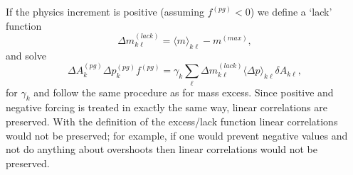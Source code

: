 If the physics increment is positive (assuming $f^{(pg)}<0$) we define a `lack' function
\begin{equation}
\Delta m^{(lack)}_{k\ell}=\langle m\rangle_{k\ell}-m^{(max)},
\end{equation}
and solve
\begin{equation}
\Delta A_k^{(pg)}\Delta p_k^{(pg)}f^{(pg)}=\gamma_k \sum_\ell \Delta m^{(lack)}_{k\ell}\langle \Delta p\rangle_{k\ell} \delta A_{k\ell},
\end{equation}
for $\gamma_k$ and follow the same procedure as for mass excess. Since positive and negative forcing is treated in exactly the same way, linear correlations are preserved. With the definition of the excess/lack function linear correlations would not be preserved; for example, if one would prevent negative values and not do anything about overshoots then linear correlations would not be preserved.



{\color{red}{mention why the problem is well-posed}}
